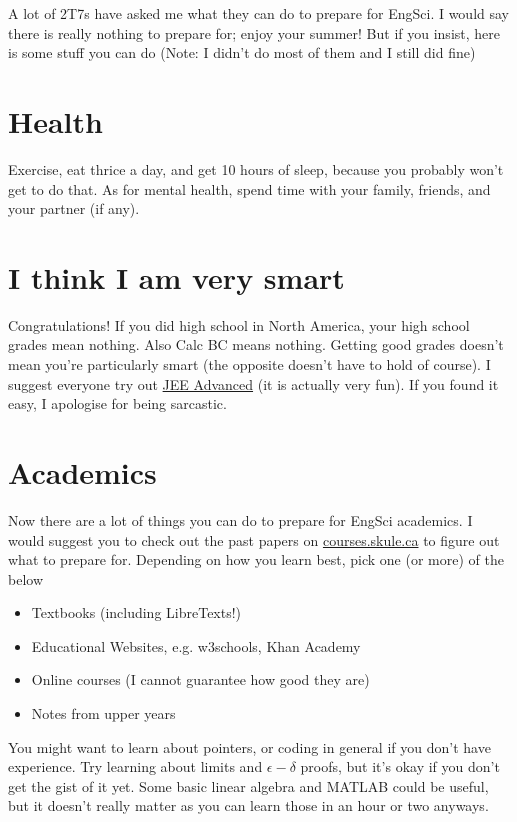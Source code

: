 A lot of 2T7s have asked me what they can do to prepare for EngSci. I would say there is really nothing to prepare for; enjoy your summer! But if you insist, here is some stuff you can do (Note: I didn't do most of them and I still did fine)

\section{Health}

Exercise, eat thrice a day, and get 10 hours of sleep, because you probably won't get to do that. As for mental health, spend time with your family, friends, and your partner (if any).

\section{I think I am very smart}

Congratulations! If you did high school in North America, your high school grades mean nothing. Also Calc BC means nothing. Getting good grades doesn't mean you're particularly smart (the opposite doesn't have to hold of course). I suggest everyone try out \href{https://byjus.com/jee/jee-advanced-2022-question-paper/https://byjus.com/jee/jee-advanced-2022-question-paper/}{JEE Advanced} (it is actually very fun). If you found it easy, I apologise for being sarcastic.

\section{Academics}

Now there are a lot of things you can do to prepare for EngSci academics. I would suggest you to check out the past papers on \url{courses.skule.ca} to figure out what to prepare for. Depending on how you learn best, pick one (or more) of the below

\begin{itemize}
    \item Textbooks (including LibreTexts!)
    \item Educational Websites, e.g. w3schools, Khan Academy
    \item Online courses (I cannot guarantee how good they are)
    \item Notes from upper years
\end{itemize}

You might want to learn about pointers, or coding in general if you don't have experience. Try learning about limits and $\epsilon-\delta$ proofs, but it's okay if you don't get the gist of it yet. Some basic linear algebra and MATLAB could be useful, but it doesn't really matter as you can learn those in an hour or two anyways.


